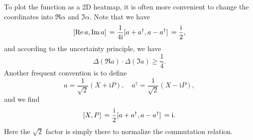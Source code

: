 \documentclass[hyperref, a4paper]{article}
\newcommand*{\ii}{\mathrm{i}}
\begin{document}
To plot the function as a 2D heatmap,
it is often more convenient to change the coordinates into $\Re \alpha$ and $\Im \alpha$.
Note that we have 
\begin{equation}
    \comm*{\Re a}{\Im a} = \frac{1}{4 \ii} \comm*{a + a^\dagger}{a - a^\dagger}
    = \frac{\ii}{2},
\end{equation}
and according to the uncertainty principle, we have 
\begin{equation}
    \Delta (\Re a) \cdot \Delta (\Im a) \geq \frac{1}{4}.
    \label{eq:re-im-fluctuation}
\end{equation}
Another frequent convention is to define 
\begin{equation}
    a = \frac{1}{\sqrt{2}} (X + \ii P), \quad 
    a^\dagger = \frac{1}{\sqrt{2}} (X - \ii P),
    \label{eq:xy-to-a}
\end{equation}
and we find 
\begin{equation}
    \comm*{X}{P} = \frac{\ii}{2} \comm*{a + a^\dagger}{a - a^\dagger} = \ii.
\end{equation}
Here the $\sqrt{2}$ factor is simply there to normalize the commutation relation.
\end{document}
